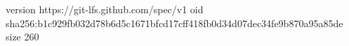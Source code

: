 version https://git-lfs.github.com/spec/v1
oid sha256:b1c929fb032d78b6d5c1671bfcd17cff418fb0d34d07dec34fe9b870a95a85de
size 260
